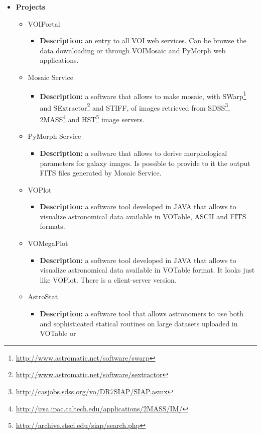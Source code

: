 \begin{itemize}
\item \textbf{Projects}
\begin{itemize}
\item VOIPortal
\begin{itemize}
\item \textbf{Description:} an entry to all VOI web services. Can be browse the
data downloading or through VOIMosaic and PyMorph web applications.
\end{itemize}
\item Mosaic Service
\begin{itemize}
\item \textbf{Description:} a software that allows to make mosaic, with
SWarp\footnote{\url{http://www.astromatic.net/software/swarp}} and
SExtractor\footnote{\url{http://www.astromatic.net/software/sextractor}} and
STIFF, of images retrieved from
SDSS\footnote{\url{http://casjobs.sdss.org/vo/DR7SIAP/SIAP.asmx}},
2MASS\footnote{\url{http://irsa.ipac.caltech.edu/applications/2MASS/IM/}} and
HST\footnote{\url{http://archive.stsci.edu/siap/search.php}} image servers.
\end{itemize}
\item PyMorph Service
\begin{itemize}
\item \textbf{Description:} a software that allows to derive morphological
parameters for galaxy images. Is possible to provide to it the output FITS files
generated by Mosaic Service.
\end{itemize}
\item VOPlot
\begin{itemize}
\item \textbf{Description:} a software tool developed in JAVA that allows to
visualize astronomical data available in VOTable, ASCII and FITS formats.
\end{itemize}
\item VOMegaPlot
\begin{itemize}
\item \textbf{Description:} a software tool developed in JAVA that allows to
visualize astronomical data available in VOTable format. It looks just like
VOPlot. There is a client-server version.
\end{itemize}
\item AstroStat
\begin{itemize}
\item \textbf{Description:} a software tool that allows astronomers to use both
and sophisticated statical routines on large datasets uploaded in VOTable or

\end{itemize}
\end{itemize}
\end{itemize}
